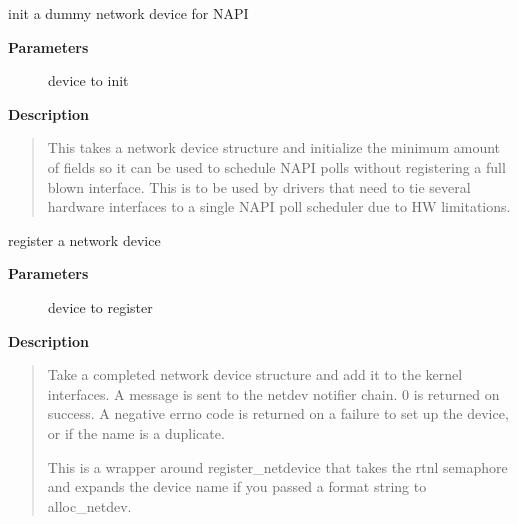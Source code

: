 \documentclass[a4paper,8pt,english]{sphinxmanual}
\begin{document}
\begin{fulllineitems}
\label{networking/kapi:c.init_dummy_netdev}
init a dummy network device for NAPI

\end{fulllineitems}


\textbf{Parameters}
\begin{description}
\item[{}] \leavevmode
device to init

\end{description}

\textbf{Description}
\begin{quote}

This takes a network device structure and initialize the minimum
amount of fields so it can be used to schedule NAPI polls without
registering a full blown interface. This is to be used by drivers
that need to tie several hardware interfaces to a single NAPI
poll scheduler due to HW limitations.
\end{quote}

\begin{fulllineitems}
\label{networking/kapi:c.register_netdev}
register a network device

\end{fulllineitems}


\textbf{Parameters}
\begin{description}
\item[{}] \leavevmode
device to register

\end{description}

\textbf{Description}
\begin{quote}

Take a completed network device structure and add it to the kernel
interfaces. A  message is sent to the netdev notifier
chain. 0 is returned on success. A negative errno code is returned
on a failure to set up the device, or if the name is a duplicate.

This is a wrapper around register\_netdevice that takes the rtnl semaphore
and expands the device name if you passed a format string to
alloc\_netdev.
\end{quote}
\end{document}
